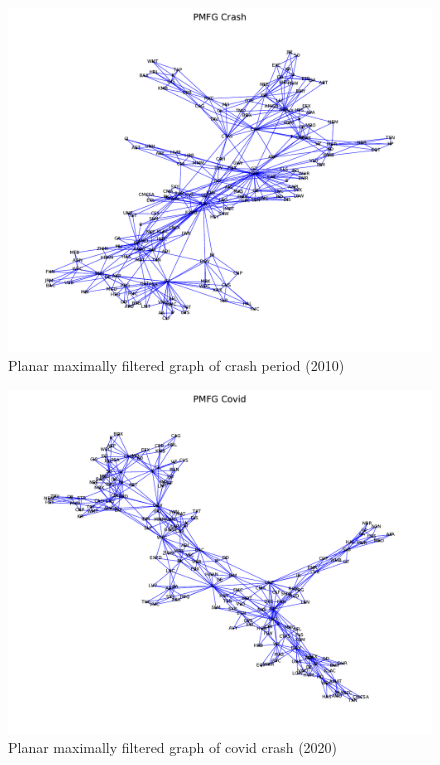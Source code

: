 \documentclass[sigchi]{acmart}
\begin{document}
\begin{figure}[H]
	\centering
	\includegraphics[width=\linewidth]{PMFG Crash.pdf}
	\caption{Planar maximally filtered graph of crash period (2010)}
\end{figure}
\begin{figure}[H]
	\centering
	\includegraphics[width=\linewidth]{PMFG Covid.pdf}
	\caption{Planar maximally filtered graph of covid crash (2020)}
\end{figure}
\end{document}
